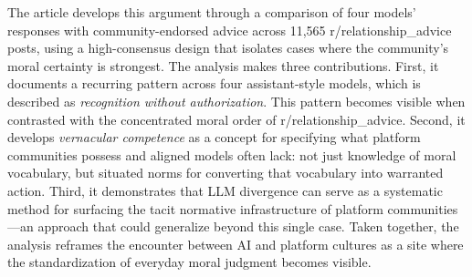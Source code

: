 The article develops this argument through a comparison of four models' responses with community-endorsed advice across 11,565 r/relationship\_advice posts, using a high-consensus design that isolates cases where the community's moral certainty is strongest. The analysis makes three contributions. First, it documents a recurring pattern across four assistant-style models, which is described as \textit{recognition without authorization}. This pattern becomes visible when contrasted with the concentrated moral order of r/relationship\_advice. Second, it develops \textit{vernacular competence} as a concept for specifying what platform communities possess and aligned models often lack: not just knowledge of moral vocabulary, but situated norms for converting that vocabulary into warranted action. Third, it demonstrates that LLM divergence can serve as a systematic method for surfacing the tacit normative infrastructure of platform communities---an approach that could generalize beyond this single case. Taken together, the analysis reframes the encounter between AI and platform cultures as a site where the standardization of everyday moral judgment becomes visible.
